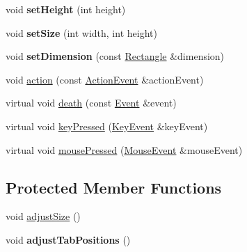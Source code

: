 \begin{DoxyCompactItemize}
\item 
void {\bfseries set\+Height} (int height)\hypertarget{classgcn_1_1TabbedArea_adc89c1f7dc1153fbdda50480134b6c06}{}\label{classgcn_1_1TabbedArea_adc89c1f7dc1153fbdda50480134b6c06}

\item 
void {\bfseries set\+Size} (int width, int height)\hypertarget{classgcn_1_1TabbedArea_a8270714564a9468a1a6ac2fab4888c09}{}\label{classgcn_1_1TabbedArea_a8270714564a9468a1a6ac2fab4888c09}

\item 
void {\bfseries set\+Dimension} (const \hyperlink{classgcn_1_1Rectangle}{Rectangle} \&dimension)\hypertarget{classgcn_1_1TabbedArea_a1e602bc43a066aede7cc22cf47ffd015}{}\label{classgcn_1_1TabbedArea_a1e602bc43a066aede7cc22cf47ffd015}

\item 
void \hyperlink{classgcn_1_1TabbedArea_ae9e032989a974cee2f2410779d6b95c3}{action} (const \hyperlink{classgcn_1_1ActionEvent}{Action\+Event} \&action\+Event)
\item 
virtual void \hyperlink{classgcn_1_1TabbedArea_aacf206f5ea02e67b295b7b26ea2a6eac}{death} (const \hyperlink{classgcn_1_1Event}{Event} \&event)
\item 
virtual void \hyperlink{classgcn_1_1TabbedArea_acf74259509f87beb23bdd645325fd0e9}{key\+Pressed} (\hyperlink{classgcn_1_1KeyEvent}{Key\+Event} \&key\+Event)
\item 
virtual void \hyperlink{classgcn_1_1TabbedArea_a235f0d2a7162a9cab6ad0fb68d60f08e}{mouse\+Pressed} (\hyperlink{classgcn_1_1MouseEvent}{Mouse\+Event} \&mouse\+Event)
\end{DoxyCompactItemize}
\subsection*{Protected Member Functions}
\begin{DoxyCompactItemize}
\item 
void \hyperlink{classgcn_1_1TabbedArea_acb0a69800cb3ead2340d15f586ba733e}{adjust\+Size} ()
\item 
void {\bfseries adjust\+Tab\+Positions} ()\hypertarget{classgcn_1_1TabbedArea_ac6e2c9c6248547fcd1967df5b40a4b5f}{}\label{classgcn_1_1TabbedArea_ac6e2c9c6248547fcd1967df5b40a4b5f}

\end{DoxyCompactItemize}
